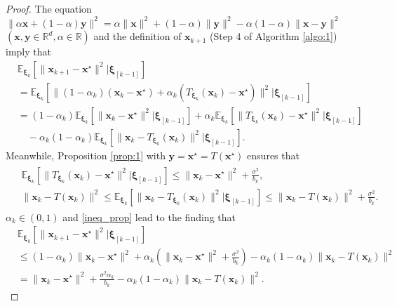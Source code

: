 \documentclass[smallextended,referee,envcountsect,]{svjour3}
\begin{document}
\begin{proof}
The equation $\|\alpha \bm{x} + (1-\alpha) \bm{y} \|^2 = \alpha \|\bm{x}\|^2 + (1-\alpha) \|\bm{y}\|^2 - \alpha (1-\alpha)\|\bm{x} - \bm{y}\|^2$ $(\bm{x},\bm{y} \in \mathbb{R}^d, \alpha \in \mathbb{R})$ and the definition of $\bm{x}_{k+1}$ (Step 4 of Algorithm \ref{algo:1}) imply that
\begin{align*}
&\mathbb{E}_{\bm{\xi}_k} \left[ \| \bm{x}_{k+1} - \bm{x}^\star \|^2 \big| \bm{\xi}_{[k-1]} \right]\\
&= 
\mathbb{E}_{\bm{\xi}_k} \left[ \| (1-\alpha_k) (\bm{x}_{k} - \bm{x}^\star)
+ \alpha_k (T_{\bm{\xi}_k} (\bm{x}_{k}) - \bm{x}^\star) \|^2 \big| \bm{\xi}_{[k-1]} \right]\\
&=
(1-\alpha_k) \mathbb{E}_{\bm{\xi}_k} \left[ \| \bm{x}_{k} - \bm{x}^\star \|^2 \big| \bm{\xi}_{[k-1]} \right]
+ 
\alpha_k \mathbb{E}_{\bm{\xi}_k} \left[ \| T_{\bm{\xi}_k} (\bm{x}_{k}) - \bm{x}^\star \|^2 \big| \bm{\xi}_{[k-1]} \right]\\
&\quad - \alpha_k (1 - \alpha_k) \mathbb{E}_{\bm{\xi}_k} \left[ \| \bm{x}_k - T_{\bm{\xi}_k} (\bm{x}_{k})\|^2 \big| \bm{\xi}_{[k-1]} \right]. 
\end{align*}
Meanwhile, Proposition \ref{prop:1} with $\bm{y} = \bm{x}^\star = T(\bm{x}^\star)$ ensures that
\begin{align}\label{ineq_prop}
\begin{split}
&\mathbb{E}_{\bm{\xi}_k} \left[ \| T_{\bm{\xi}_k} (\bm{x}_{k}) - \bm{x}^\star \|^2 \big| \bm{\xi}_{[k-1]} \right]
\leq 
\| \bm{x}_{k} - \bm{x}^\star \|^2 + \frac{\sigma^2}{b_k},\\
&\| \bm{x}_k - T (\bm{x}_{k})\|^2
\leq
\mathbb{E}_{\bm{\xi}_k} \left[ \| \bm{x}_k - T_{\bm{\xi}_k} (\bm{x}_{k})\|^2 \big| \bm{\xi}_{[k-1]} \right]
\leq 
\| \bm{x}_k - T (\bm{x}_{k})\|^2 + \frac{\sigma^2}{b_k}.
\end{split}
\end{align} 
$\alpha_k \in (0,1)$ and \eqref{ineq_prop} lead to the finding that
\begin{align*}
&\mathbb{E}_{\bm{\xi}_k} \left[ \| \bm{x}_{k+1} - \bm{x}^\star \|^2 \big| \bm{\xi}_{[k-1]} \right]\\
&\leq 
(1-\alpha_k)  \| \bm{x}_{k} - \bm{x}^\star \|^2 
+ 
\alpha_k \left( \| \bm{x}_{k} - \bm{x}^\star \|^2 + \frac{\sigma^2}{b_k} \right)
- \alpha_k (1 - \alpha_k) \| \bm{x}_k - T (\bm{x}_{k})\|^2\\
&= 
\| \bm{x}_{k} - \bm{x}^\star \|^2 + \frac{\sigma^2 \alpha_k}{b_k}
- \alpha_k (1 - \alpha_k) \| \bm{x}_k - T (\bm{x}_{k})\|^2.

\end{align*}
\end{proof}
\end{document}
